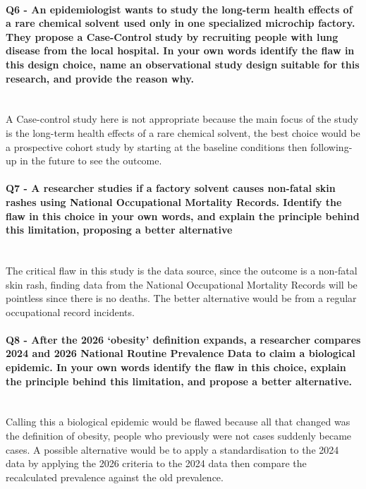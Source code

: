 \documentclass{article}
\begin{document}
\paragraph{Q6 - An epidemiologist wants to study the long-term health effects of a rare chemical solvent used only in one specialized microchip factory. They propose a Case-Control study by recruiting people with lung disease from the local hospital. In your own words identify the flaw in this design choice, name an observational study design suitable for this research, and provide the reason why.} \mbox{} \\

A Case-control study here is not appropriate because the main focus of the study is the long-term health effects of a rare chemical solvent, the best choice would be a prospective cohort study by starting at the baseline conditions then following-up in the future to see the outcome.

\paragraph{Q7 - A researcher studies if a factory solvent causes non-fatal skin rashes using National Occupational Mortality Records. Identify the flaw in this choice in your own words, and explain the principle behind this limitation, proposing a better alternative} \mbox{} \\

The critical flaw in this study is the data source, since the outcome is a non-fatal skin rash, finding data from the National Occupational Mortality Records will be pointless since there is no deaths. The better alternative would be from a regular occupational record incidents.

\paragraph{Q8 - After the 2026 ‘obesity’ definition expands, a researcher compares 2024 and 2026 National Routine Prevalence Data to claim a biological epidemic. In your own words identify the flaw in this choice, explain the principle behind this limitation, and propose a better alternative.} \mbox{} \\

Calling this a biological epidemic would be flawed because all that changed was the definition of obesity, people who previously were not cases suddenly became cases. A possible alternative would be to apply a standardisation to the 2024 data by applying the 2026 criteria to the 2024 data then compare the recalculated prevalence against the old prevalence.
\end{document}
